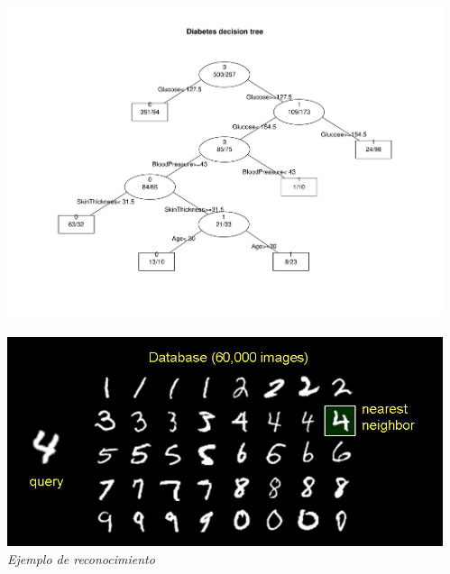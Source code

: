 \documentclass[8pt]{beamer}
\begin{document}
\begin{frame}
\begin{columns}[T]
\begin{column}{.5\textwidth}
       \end{column}
       \begin{column}{.5\textwidth}
	  \begin{center}
	  \includegraphics[width=\textwidth]{imgs/tree.pdf} %
	  \\~\\
	  \includegraphics[width=.8\textwidth]{imgs/digit_database.jpg} %
	  \\ \centering \textit{Ejemplo de reconocimiento}
	  \end{center}
       \end{column}
      \end{columns}
    \end{frame}
    
\end{document}
